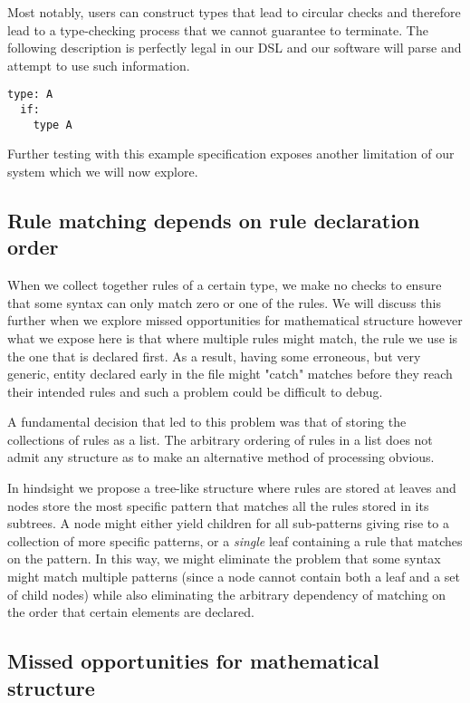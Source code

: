 Most notably, users can construct types that lead to circular
checks and therefore lead to a type-checking process that we cannot
guarantee to terminate. The following description is perfectly legal
in our DSL and our software will parse and attempt to use such
information.

\begin{verbatim}
type: A
  if:
    type A
\end{verbatim}

Further testing with this example specification exposes another
limitation of our system which we will now explore.

\subsection{Rule matching depends on rule declaration order}

When we collect together rules of a certain type, we make no checks to
ensure that some syntax can only match zero or one of the rules. We
will discuss this further when we explore missed opportunities for
mathematical structure however what we expose here is that where
multiple rules might match, the rule we use is the one that
is declared first. As a result, having some erroneous, but very
generic, entity declared early in the file might "catch" matches
before they reach their intended rules and such a problem could be
difficult to debug.

A fundamental decision that led to this problem was that of storing
the collections of rules as a list. The arbitrary ordering of rules in
a list does not admit any structure as to make an alternative method of
processing obvious.

In hindsight we propose a tree-like structure where rules are stored
at leaves and nodes store the most specific pattern that matches all
the rules stored in its subtrees. A node might either yield children
for all sub-patterns giving rise to a collection of more specific
patterns, or a \emph{single} leaf containing a rule that matches on the
pattern. In this way, we might eliminate the problem that some syntax
might match multiple patterns (since a node cannot contain both a leaf
and a set of child nodes) while also eliminating the arbitrary
dependency of matching on the order that certain elements are declared.

\subsection{Missed opportunities for mathematical structure}

